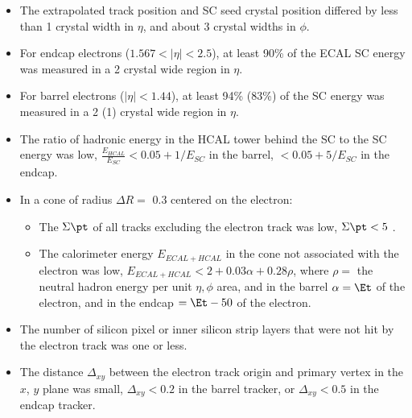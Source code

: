 \begin{itemize}
	\item The extrapolated track position and SC seed crystal position differed by less than 1 crystal width in $\eta$, and 
		about 3 crystal widths in $\phi$.
	\item For endcap electrons ($1.567 < |\eta| < 2.5$), at least 90\% of the ECAL SC energy was measured in a 2 crystal wide 
		region in $\eta$.
	\item For barrel electrons ($|\eta| < 1.44$), at least 94\% (83\%) of the SC energy was measured in a 2 (1) crystal wide 
		region in $\eta$.
	\item The ratio of hadronic energy in the HCAL tower behind the SC to the SC energy was low, $\frac{E_{HCAL}}{E_{SC}} < 0.05 + 1/E_{SC}$ in the barrel, $< 0.05 + 5/E_{SC}$ in the endcap.
	\item In a cone of radius $\Delta R =$ 0.3 centered on the electron:
	\begin{itemize}
		\item The $\Sigma \pt$ of all tracks excluding the electron track was low, $\Sigma \pt < 5$ \GeV.
		\item The calorimeter energy $E_{ECAL + HCAL}$ in the cone not associated with the electron was low, 
			$E_{ECAL + HCAL} < 2 + 0.03\alpha + 0.28\rho$, where $\rho =$ the neutral hadron energy per unit $\eta,\phi$ area, 
			and in the barrel $\alpha = \Et$ of the electron, and in the endcap $= \Et - 50$ of the electron.
	\end{itemize}
	\item The number of silicon pixel or inner silicon strip layers that were not hit by the electron track was one or less. 
	\item The distance $\Delta_{xy}$ between the electron track origin and primary vertex in the $x$, $y$ plane was small, 
		$\Delta_{xy} < 0.2$ \mm in the barrel tracker, or $\Delta_{xy} < 0.5$ \mm in the endcap tracker.
\end{itemize}

